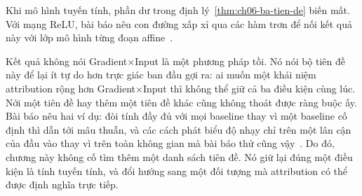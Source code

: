 Khi mô hình tuyến tính, phần dư trong định lý~\ref{thm:ch06-ba-tien-de} biến
mất. Với mạng ReLU, bài báo nêu con đường xấp xỉ qua các hàm trơn để nối
kết quả này với lớp mô hình từng đoạn affine~\autocite{p17firstprinciples}.

Kết quả không nói Gradient$\mathbin{\times}$Input là một phương pháp tồi. Nó
nói bộ tiên đề này để lại ít tự do hơn trực giác ban đầu gợi ra: ai muốn một
khái niệm attribution rộng hơn Gradient$\mathbin{\times}$Input thì không thể
giữ cả ba điều kiện cùng lúc. Nới một tiên đề hay thêm một tiên đề khác cũng
không thoát được ràng buộc ấy. Bài báo nêu hai ví dụ: đòi tính đầy đủ với mọi
baseline thay vì một baseline cố định thì dẫn tới mâu thuẫn, và các cách phát
biểu độ nhạy chỉ trên một lân cận của đầu vào thay vì trên toàn không gian mà
bài báo thử cũng vậy~\autocite{p17firstprinciples}.
Do đó, chương này không cố tìm thêm một danh sách tiên đề. Nó giữ lại đúng một
điều kiện là tính tuyến tính, và đổi hướng sang một đối tượng mà attribution
có thể được định nghĩa trực tiếp.
